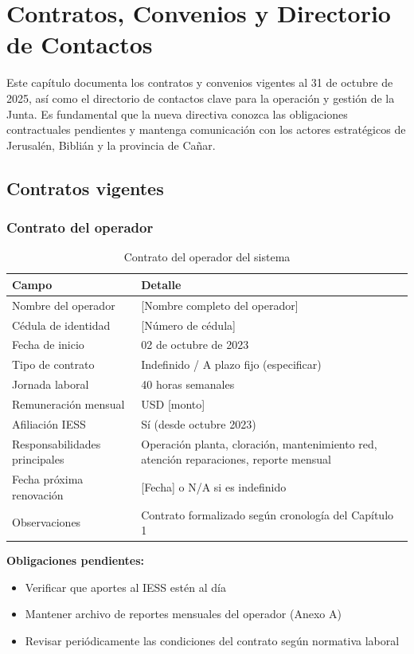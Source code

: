 \chapter{Contratos, Convenios y Directorio de Contactos}

Este capítulo documenta los contratos y convenios vigentes al 31 de octubre de 2025, así como el directorio de contactos clave para la operación y gestión de la Junta. Es fundamental que la nueva directiva conozca las obligaciones contractuales pendientes y mantenga comunicación con los actores estratégicos de Jerusalén, Biblián y la provincia de Cañar.

\section{Contratos vigentes}

\subsection*{Contrato del operador}

\begin{table}[H]
\centering
\caption{Contrato del operador del sistema}
\label{tab:contrato-operador}
\begin{tabularx}{\textwidth}{@{}lX@{}}
\toprule
\textbf{Campo} & \textbf{Detalle} \\
\midrule
Nombre del operador & [Nombre completo del operador] \\
Cédula de identidad & [Número de cédula] \\
Fecha de inicio & 02 de octubre de 2023 \\
Tipo de contrato & Indefinido / A plazo fijo (especificar) \\
Jornada laboral & 40 horas semanales \\
Remuneración mensual & USD [monto] \\
Afiliación IESS & Sí (desde octubre 2023) \\
Responsabilidades principales & Operación planta, cloración, mantenimiento red, atención reparaciones, reporte mensual \\
Fecha próxima renovación & [Fecha] o N/A si es indefinido \\
Observaciones & Contrato formalizado según cronología del Capítulo 1 \\
\bottomrule
\end{tabularx}
\end{table}

\textbf{Obligaciones pendientes:}
\begin{itemize}
  \item Verificar que aportes al IESS estén al día
  \item Mantener archivo de reportes mensuales del operador (Anexo A)
  \item Revisar periódicamente las condiciones del contrato según normativa laboral
\end{itemize}

